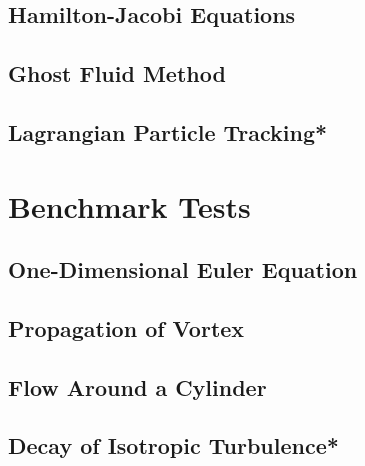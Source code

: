 \documentclass[12pt, letterpaper]{report}
\begin{document}
\section{Hamilton-Jacobi Equations}

\section{Ghost Fluid Method}

\section{Lagrangian Particle Tracking*}

\chapter{Benchmark Tests}

\section{One-Dimensional Euler Equation}

\section{Propagation of Vortex}

\section{Flow Around a Cylinder}

\section{Decay of Isotropic Turbulence*}










\clearpage


\end{document}
